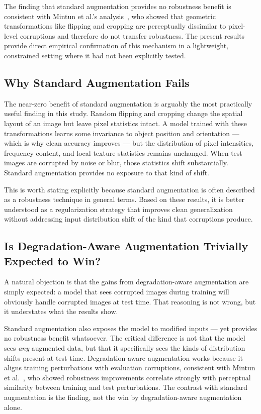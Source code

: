 \documentclass[conference]{IEEEtran}
\begin{document}
The finding that standard augmentation provides no robustness benefit is consistent with Mintun et al.'s analysis~\cite{mintun2021}, who showed that geometric transformations like flipping and cropping are perceptually dissimilar to pixel-level corruptions and therefore do not transfer robustness. The present results provide direct empirical confirmation of this mechanism in a lightweight, constrained setting where it had not been explicitly tested.

\subsection{Why Standard Augmentation Fails}

The near-zero benefit of standard augmentation is arguably the most practically useful finding in this study. Random flipping and cropping change the spatial layout of an image but leave pixel statistics intact. A model trained with these transformations learns some invariance to object position and orientation --- which is why clean accuracy improves --- but the distribution of pixel intensities, frequency content, and local texture statistics remains unchanged. When test images are corrupted by noise or blur, those statistics shift substantially. Standard augmentation provides no exposure to that kind of shift.

This is worth stating explicitly because standard augmentation is often described as a robustness technique in general terms. Based on these results, it is better understood as a regularization strategy that improves clean generalization without addressing input distribution shift of the kind that corruptions produce.

\subsection{Is Degradation-Aware Augmentation Trivially Expected to Win?}

A natural objection is that the gains from degradation-aware augmentation are simply expected: a model that sees corrupted images during training will obviously handle corrupted images at test time. That reasoning is not wrong, but it understates what the results show.

Standard augmentation also exposes the model to modified inputs --- yet provides no robustness benefit whatsoever. The critical difference is not that the model sees \emph{any} augmented data, but that it specifically sees the kinds of distribution shifts present at test time. Degradation-aware augmentation works because it aligns training perturbations with evaluation corruptions, consistent with Mintun et al.~\cite{mintun2021}, who showed robustness improvements correlate strongly with perceptual similarity between training and test perturbations. The contrast with standard augmentation is the finding, not the win by degradation-aware augmentation alone.
\end{document}
